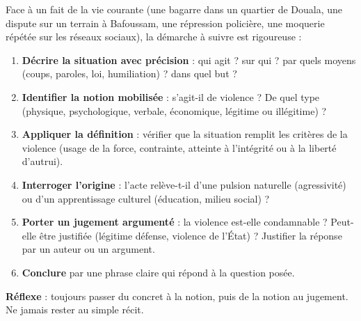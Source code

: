 \documentclass[11pt]{article}
\begin{document}
\begin{methode}
Face à un fait de la vie courante (une bagarre dans un quartier de Douala, une dispute sur un terrain à Bafoussam, une répression policière, une moquerie répétée sur les réseaux sociaux), la démarche à suivre est rigoureuse :
\begin{enumerate}
\item \textbf{Décrire la situation avec précision} : qui agit ? sur qui ? par quels moyens (coups, paroles, loi, humiliation) ? dans quel but ?
\item \textbf{Identifier la notion mobilisée} : s'agit-il de violence ? De quel type (physique, psychologique, verbale, économique, légitime ou illégitime) ?
\item \textbf{Appliquer la définition} : vérifier que la situation remplit les critères de la violence (usage de la force, contrainte, atteinte à l'intégrité ou à la liberté d'autrui).
\item \textbf{Interroger l'origine} : l'acte relève-t-il d'une pulsion naturelle (agressivité) ou d'un apprentissage culturel (éducation, milieu social) ?
\item \textbf{Porter un jugement argumenté} : la violence est-elle condamnable ? Peut-elle être justifiée (légitime défense, violence de l'État) ? Justifier la réponse par un auteur ou un argument.
\item \textbf{Conclure} par une phrase claire qui répond à la question posée.
\end{enumerate}
\textbf{Réflexe} : toujours passer du concret à la notion, puis de la notion au jugement. Ne jamais rester au simple récit.
\end{methode}
\end{document}
